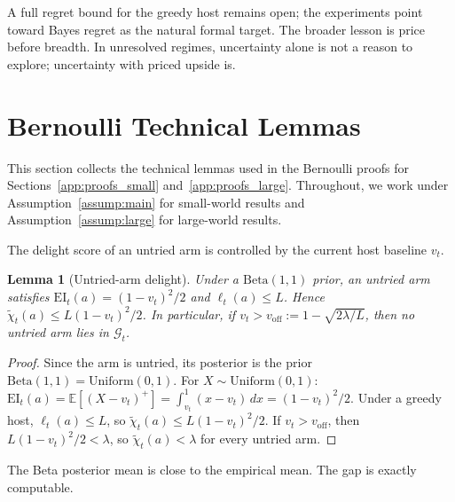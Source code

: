 \documentclass{article}
\newtheorem{lemma} {Lemma}
\newcommand{\Gc}{\mathcal{G}}
\newcommand{\E}{\mathbb{E}}
\newcommand{\surp}{\ell} %
\newcommand{\delight}{\chi} %
\newcommand{\EI}{\mathrm{EI}} %
\begin{document}
A full regret bound for the greedy host remains open; the experiments point toward Bayes regret as the natural formal target.
The broader lesson is price before breadth.
In unresolved regimes, uncertainty alone is not a reason to explore; uncertainty with priced upside is.





\newpage




\newpage
\appendix

\section{Bernoulli Technical Lemmas}
\label{app:lemmas}

This section collects the technical lemmas used in the Bernoulli proofs for Sections~\ref{app:proofs_small} and~\ref{app:proofs_large}.
Throughout, we work under Assumption~\ref{assump:main} for small-world results and Assumption~\ref{assump:large} for large-world results.

The delight score of an untried arm is controlled by the current host baseline $v_t$.

\begin{lemma}[Untried-arm delight]
\label{lem:untried}
Under a $\mathrm{Beta}(1,1)$ prior, an untried arm satisfies $\EI_t(a) = (1-v_t)^2/2$ and $\surp_t(a) \le L$.
Hence $\tilde{\delight}_t(a) \le L(1-v_t)^2/2$.
In particular, if $v_t > v_{\mathrm{off}} := 1 - \sqrt{2\lambda/L}$, then no untried arm lies in $\Gc_t$.
\end{lemma}

\begin{proof}
Since the arm is untried, its posterior is the prior $\mathrm{Beta}(1,1) = \mathrm{Uniform}(0,1)$.
For $X \sim \mathrm{Uniform}(0,1)$: $\EI_t(a) = \E[(X-v_t)^+] = \int_{v_t}^1 (x-v_t)\,dx = (1-v_t)^2/2$.
Under a greedy host, $\surp_t(a) \le L$, so $\tilde{\delight}_t(a) \le L(1-v_t)^2/2$.
If $v_t > v_{\mathrm{off}}$, then $L(1-v_t)^2/2 < \lambda$, so $\tilde{\delight}_t(a) < \lambda$ for every untried arm.
\end{proof}


The Beta posterior mean is close to the empirical mean.
The gap is exactly computable.
\end{document}
